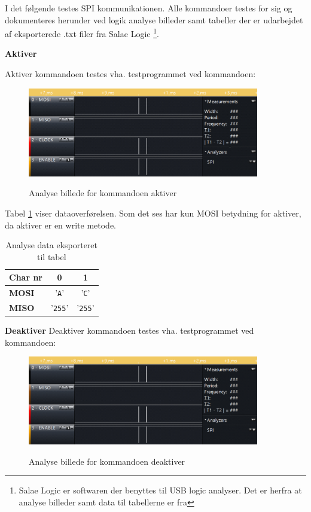 

I det følgende testes SPI kommunikationen. Alle kommandoer testes for sig og dokumenteres herunder ved logik analyse billeder samt tabeller der er udarbejdet af eksporterede .txt filer fra Salae Logic \footnote{Salae Logic er softwaren der benyttes til USB logic analyser. Det er herfra at analyse billeder samt data til tabellerne er fra}. 


\textbf{Aktiver}

Aktiver kommandoen testes vha. testprogrammet ved kommandoen: 


\begin{figure}[H]
\centering
{\includegraphics[width=0.90\textwidth]{filer/modultest/Billeder/activate}}
\caption{Analyse billede for kommandoen aktiver}
\label{lab:scop_activate}
\end{figure}

Tabel \ref{table:scop_activate} viser dataoverførelsen. Som det ses har kun MOSI betydning for aktiver, da aktiver er en write metode. 

\begin{table}[H]
	\caption{Analyse data eksporteret til tabel}
	\centering
	\begin{tabular}{|l|c|c|}
		\hline 
		\textbf{Char nr} & \textbf{0} & \textbf{1} \\ 		
		\hline 
		\textbf{MOSI} & '\verb+A+' & '\verb+C+' \\ 
		\hline 
		\textbf{MISO} & '\verb+255+' & '\verb+255+' \\ 
		\hline 
	\end{tabular} 
	\label{table:scop_activate}
\end{table}


\textbf{Deaktiver}
Deaktiver kommandoen testes vha. testprogrammet ved kommandoen: 


\begin{figure}[H]
\centering
{\includegraphics[width=0.90\textwidth]{filer/modultest/Billeder/deactivate}}
\caption{Analyse billede for kommandoen deaktiver}
\label{lab:scop_deactivate}
\end{figure}

